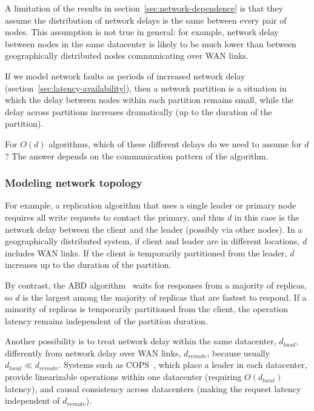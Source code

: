 \documentclass[a4paper,twocolumn,10pt]{article}
\begin{document}
A limitation of the results in section~\ref{sec:network-dependence} is that they assume the
distribution of network delays is the same between every pair of nodes. This assumption is not true
in general: for example, network delay between nodes in the same datacenter is likely to be much
lower than between geographically distributed nodes communicating over WAN links.

If we model network faults as periods of increased network delay
(section~\ref{sec:latency-availability}), then a network partition is a situation in which the delay
between nodes within each partition remains small, while the delay across partitions increases
dramatically (up to the duration of the partition).

For $O(d)$ algorithms, which of these different delays do we need to assume for $d$? The answer
depends on the communication pattern of the algorithm.

\subsubsection{Modeling network topology}

For example, a replication algorithm that uses a single leader or primary node requires all write
requests to contact the primary, and thus $d$ in this case is the network delay between the client
and the leader (possibly via other nodes). In a geographically distributed system, if client and
leader are in different locations, $d$ includes WAN links. If the client is temporarily partitioned
from the leader, $d$ increases up to the duration of the partition.

By contrast, the ABD algorithm~\cite{Attiya1995bm} waits for responses from a majority of replicas,
so $d$ is the largest among the majority of replicas that are fastest to respond. If a minority of
replicas is temporarily partitioned from the client, the operation latency remains independent of
the partition duration.

Another possibility is to treat network delay within the same datacenter, $d_\textit{local}$,
differently from network delay over WAN links, $d_\textit{remote}$, because usually
$d_\textit{local} \ll d_\textit{remote}$. Systems such as COPS~\cite{Lloyd2011hz}, which place a
leader in each datacenter, provide linearizable operations within one datacenter (requiring
$O(d_\textit{local})$ latency), and causal consistency across datacenters (making the request
latency independent of $d_\textit{remote}$).
\end{document}
